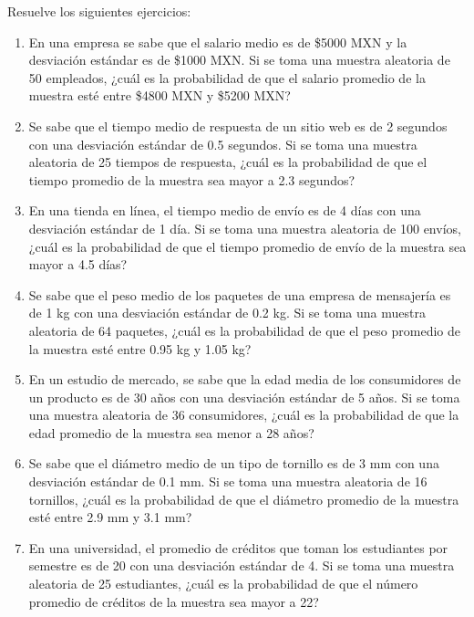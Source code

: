 \begin{Ejer}
Resuelve los siguientes ejercicios:

\begin{enumerate}
    \item En una empresa se sabe que el salario medio es de \$5000 MXN y la desviación estándar es de \$1000 MXN. Si se toma una muestra aleatoria de 50 empleados, ¿cuál es la probabilidad de que el salario promedio de la muestra esté entre \$4800 MXN y \$5200 MXN?

    \item Se sabe que el tiempo medio de respuesta de un sitio web es de 2 segundos con una desviación estándar de 0.5 segundos. Si se toma una muestra aleatoria de 25 tiempos de respuesta, ¿cuál es la probabilidad de que el tiempo promedio de la muestra sea mayor a 2.3 segundos?

    \item En una tienda en línea, el tiempo medio de envío es de 4 días con una desviación estándar de 1 día. Si se toma una muestra aleatoria de 100 envíos, ¿cuál es la probabilidad de que el tiempo promedio de envío de la muestra sea mayor a 4.5 días?

    \item Se sabe que el peso medio de los paquetes de una empresa de mensajería es de 1 kg con una desviación estándar de 0.2 kg. Si se toma una muestra aleatoria de 64 paquetes, ¿cuál es la probabilidad de que el peso promedio de la muestra esté entre 0.95 kg y 1.05 kg?

    \item En un estudio de mercado, se sabe que la edad media de los consumidores de un producto es de 30 años con una desviación estándar de 5 años. Si se toma una muestra aleatoria de 36 consumidores, ¿cuál es la probabilidad de que la edad promedio de la muestra sea menor a 28 años?

    \item Se sabe que el diámetro medio de un tipo de tornillo es de 3 mm con una desviación estándar de 0.1 mm. Si se toma una muestra aleatoria de 16 tornillos, ¿cuál es la probabilidad de que el diámetro promedio de la muestra esté entre 2.9 mm y 3.1 mm?

    \item En una universidad, el promedio de créditos que toman los estudiantes por semestre es de 20 con una desviación estándar de 4. Si se toma una muestra aleatoria de 25 estudiantes, ¿cuál es la probabilidad de que el número promedio de créditos de la muestra sea mayor a 22?


\end{enumerate}
\end{Ejer}
